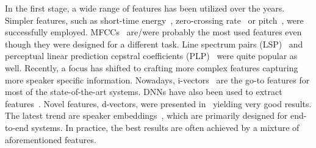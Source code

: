 \documentclass[FM,noheader,EN,bwtitles]{tulthesis}
\begin{document}
In the first stage, a wide range of features has been utilized over the years.
Simpler features, such as short-time energy~\parencite{DBLP:journals/csl/MeignierMFBB06}, zero-crossing rate~\parencite{DBLP:conf/mm/LuZ02} or pitch~\parencite{DBLP:journals/mms/LuZ05}, were successfully employed.
MFCCs~\parencite{DBLP:conf/interspeech/SinhaTGW05, DBLP:journals/taslp/LuZJ02} are/were probably the most used features even though they were designed for a different task.
Line spectrum pairs (LSP)~\parencite{DBLP:journals/taslp/LuZJ02, DBLP:journals/mms/LuZ05} and perceptual linear prediction cepstral coefficients (PLP)~\parencite{DBLP:conf/icassp/TranterYEW04, DBLP:conf/icassp/ChuTH09} were quite popular as well.
Recently, a focus has shifted to crafting more complex features capturing more speaker specific information.
Nowadays, i-vectors~\parencite{DBLP:conf/icassp/ZhuP16, DBLP:conf/icassp/NeriPRCA17} are the go-to features for most of the state-of-the-art systems.
DNNs have also been used to extract features~\parencite{DBLP:journals/tnn/ChenS11, DBLP:conf/interspeech/YellaS15}.
Novel features, d-vectors, were presented in~\parencite{DBLP:conf/icassp/WangGLXZ17} yielding very good results.
The latest trend are speaker embeddings~\parencite{DBLP:journals/corr/LiMJLZLCKZ17, DBLP:conf/icassp/Bredin17, Jati2017}, which are primarily designed for end-to-end systems.
In practice, the best results are often achieved by a mixture of aforementioned features.
\end{document}
